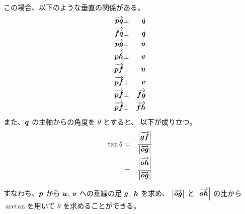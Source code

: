 \documentclass[11pt,a4j]{jarticle}
\begin{document}
この場合、以下のような垂直の関係がある。
  \begin{eqnarray}
    {\overrightarrow{{\bm{p}}{\bm{q}}}}
      & \bot &
        \dot{{\bm{q}}}
  \\
    {\overrightarrow{{\bm{f}}{\bm{q}}}}
      & \bot &
        \dot{{\bm{q}}}
  \\
    {\overrightarrow{{\bm{p}}{\bm{g}}}}
      & \bot &
        {\bm{u}}
  \\
    {\overrightarrow{{\bm{p}}{\bm{h}}}}
      & \bot &
        {\bm{v}}
  \\
    {\overrightarrow{{\bm{p}}{\bm{f}}}}
      & \bot &
        {\bm{u}}
  \\
    {\overrightarrow{{\bm{p}}{\bm{f}}}}
      & \bot &
        {\bm{v}}
  \\
    {\overrightarrow{{\bm{p}}{\bm{f}}}}
      & \bot &
        {\overrightarrow{{\bm{f}}{\bm{g}}}}
  \\
    {\overrightarrow{{\bm{p}}{\bm{f}}}}
      & \bot &
        {\overrightarrow{{\bm{f}}{\bm{h}}}}
  \end{eqnarray}
また、${\bm{q}}$ の主軸からの角度を $\theta$ とすると、
以下が成り立つ。
  \begin{eqnarray}
    \tan \theta
      & = &
        \frac{\left| {\overrightarrow{{\bm{g}}{\bm{f}}}} \right|}{\left| {\overrightarrow{{\bm{o}}{\bm{g}}}} \right|}
  \\
      & = &
        \frac{\left| {\overrightarrow{{\bm{o}}{\bm{h}}}} \right|}{\left| {\overrightarrow{{\bm{o}}{\bm{g}}}} \right|}
  \end{eqnarray}

すなわち、${\bm{p}}$ から ${\bm{u}}$, ${\bm{v}}$ への垂線の足 ${\bm{g}}$, ${\bm{h}}$ を求め、
$\left| {\overrightarrow{{\bm{o}}{\bm{g}}}} \right|$ と $\left| {\overrightarrow{{\bm{o}}{\bm{h}}}} \right|$ の比から
$\arctan$を用いて
$\theta$ を求めることができる。
\end{document}
